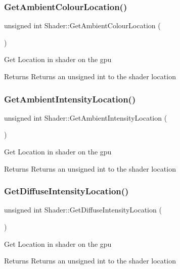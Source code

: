 \subsubsection{\texorpdfstring{GetAmbientColourLocation()}{GetAmbientColourLocation()}}
{\footnotesize\ttfamily unsigned int Shader\+::\+Get\+Ambient\+Colour\+Location (\begin{DoxyParamCaption}{ }\end{DoxyParamCaption})}

Get Location in shader on the gpu \begin{DoxyReturn}{Returns}
Returns an unsigned int to the shader location 
\end{DoxyReturn}
\mbox{\label{class_shader_a1a45ad641d9850ad398ae3ec905ffc8d}} 
\subsubsection{\texorpdfstring{GetAmbientIntensityLocation()}{GetAmbientIntensityLocation()}}
{\footnotesize\ttfamily unsigned int Shader\+::\+Get\+Ambient\+Intensity\+Location (\begin{DoxyParamCaption}{ }\end{DoxyParamCaption})}

Get Location in shader on the gpu \begin{DoxyReturn}{Returns}
Returns an unsigned int to the shader location 
\end{DoxyReturn}
\mbox{\label{class_shader_a7edd89ea4e53cae7314bf7b7efe6beee}} 
\subsubsection{\texorpdfstring{GetDiffuseIntensityLocation()}{GetDiffuseIntensityLocation()}}
{\footnotesize\ttfamily unsigned int Shader\+::\+Get\+Diffuse\+Intensity\+Location (\begin{DoxyParamCaption}{ }\end{DoxyParamCaption})}

Get Location in shader on the gpu \begin{DoxyReturn}{Returns}
Returns an unsigned int to the shader location 
\end{DoxyReturn}
\mbox{\label{class_shader_a908960431732c32040f627776e93d780}} 
